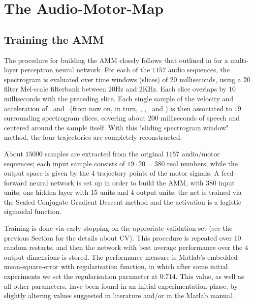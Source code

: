 \section{The Audio-Motor-Map}
\label{sec:rec}

\subsection{Training the AMM}
\label{subsec:amm_setup}

The procedure for building the AMM closely follows that outlined in
\cite{papcun,richmond2002,richmond2007} for a multi-layer perceptron neural network.
For each of the $1157$ audio sequences, the spectrogram is evaluated
over time windows (slices) of $20$ milliseconds, using a $20$ filter
Mel-scale filterbank between $20$Hz and $2$KHz. Each slice overlaps by $10$ milliseconds with
the preceding slice. Each single sample of the velocity and acceleration
of \lio\ and \ttu\ (from now on, in turn, \vlio, \alio, \vttu\ and \attu) is
then associated to $19$ surrounding spectrogram slices, covering
about $200$ milliseconds of speech and centered around the sample itself. With this
"sliding spectrogram window" method, the four trajectories are completely reconstructed.

About $15000$ samples are extracted from the original $1157$
audio/motor sequences; each input sample consists of $19\cdot 20 = 380$ real
numbers, while the output space is given by the $4$ trajectory points of
the motor signals. A feed-forward neural network is set up in order to
build the AMM, with $380$ input units, one hidden layer with $15$ units and
$4$ output units; the net is trained via the Scaled Conjugate Gradient
Descent method \cite{MOLLER93} and the activation is a logistic sigmoidal function.

Training is done via early stopping on the approriate validation set (see the previous
Section for the details about CV). This procedure is repeated over $10$ random restarts, and then
the network with best average performance over the $4$ output dimensions is stored.
The performance measure is Matlab's embedded mean-square-error with regularisation
function, in which after some initial experiments we set the regularisation
parameter at $0.714$. This value, as well as all other parameters, have been found in
an initial experimentation phase, by slightly altering values suggested in literature
and/or in the Matlab manual.

